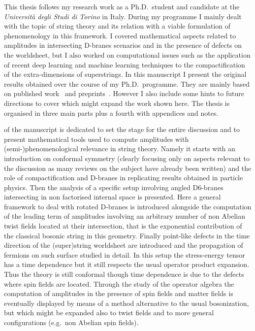 This thesis follows my research work as a Ph.D.\ student and candidate at the \emph{Università degli Studi di Torino} in Italy.
During my programme I mainly dealt with the topic of string theory and its relation with a viable formulation of phenomenology in this framework.
I covered mathematical aspects related to amplitudes in intersecting D-branes scenarios and in the presence of defects on the worldsheet, but I also worked on computational issues such as the application of recent deep learning and machine learning techniques to the compactification of the extra-dimensions of superstrings.
In this manuscript I present the original results obtained over the course of my Ph.D.\ programme.
They are mainly based on published work~\cite{Finotello:2019:ClassicalSolutionBosonic, Arduino:2020:OriginDivergencesTimeDependent} and preprints~\cite{Finotello:2019:2DFermionStrip, Erbin:2020:InceptionNeuralNetwork, Erbin:2020:MachineLearningComplete}.
However I also include some hints to future directions to cover which might expand the work shown here.
The thesis is organised in three main parts plus a fourth with appendices and notes.

 of the manuscript is dedicated to set the stage for the entire discussion and to present mathematical tools used to compute amplitudes with (semi-)phenomenological relevance in string theory.
Namely it starts with an introduction on conformal symmetry (clearly focusing only on aspects relevant to the discussion as many reviews on the subject have already been written) and the role of compactification and D-branes in replicating results obtained in particle physics.
Then the analysis of a specific setup involving angled D6-branes intersecting in non factorised internal space is presented.\footnotemark{}
Here a general framework to deal with  rotated D-branes is introduced alongside the computation of the leading term of amplitudes involving an arbitrary number of non Abelian twist fields located at their intersection, that is the exponential contribution of the classical bosonic string in this geometry.
Finally point-like defects in the time direction of the (super)string worldsheet are introduced and the propagation of fermions on such surface studied in detail.
In this setup the stress-energy tensor has a time dependence but it still respects the usual operator product expansion.
Thus the theory is still conformal though time dependence is due to the defects where spin fields are located.
Through the study of the operator algebra the computation of amplitudes in the presence of spin fields and matter fields is eventually displayed by means of a method alternative to the usual bosonization, but which might be expanded also to twist fields and to more general configurations (e.g.\ non Abelian spin fields).

